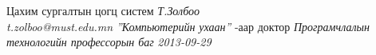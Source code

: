 \documentclass[a4paper,11pt]{report}
\begin{document}


\thesistitle
	{Цахим сургалтын цогц систем}
	{\emph{Т.Золбоо\\t.zolboo@must.edu.mn}}
	{\emph{''Компьютерийн ухаан''} -аар доктор}
	{\emph{Програмчлалын технологийн профессорын баг}}
	{\emph{2013-09-29}}










\appendix


\end{document}

